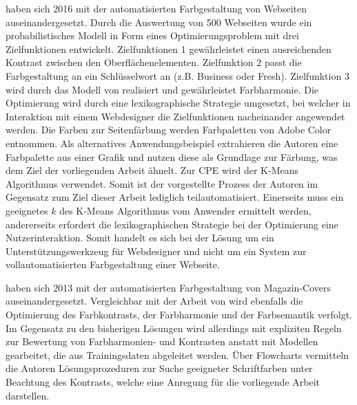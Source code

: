 \citet{webpage} haben sich 2016 mit der automatisierten Farbgestaltung von Webseiten auseinandergesetzt. Durch die Auswertung von 500 Webseiten wurde ein probabilistisches Modell in Form eines Optimierungsproblem mit drei Zielfunktionen entwickelt. Zielfunktionen 1 gewährleistet einen ausreichenden Kontrast zwischen den Oberflächenelementen. Zielfunktion 2 passt die Farbgestaltung an ein Schlüsselwort an (z.B. \glqq{}Business\grqq{} oder \glqq{}Fresh\grqq{}). Zielfunktion 3 wird durch das Modell von \citet{colorcomp} realisiert und gewährleistet Farbharmonie. Die Optimierung wird durch eine lexikographische Strategie umgesetzt, bei welcher in Interaktion mit einem Webdesigner die Zielfunktionen nacheinander angewendet werden. Die Farben zur Seitenfärbung werden Farbpaletten von Adobe Color entnommen. Als alternatives Anwendungsbeispiel extrahieren die Autoren eine Farbpalette aus einer Grafik und nutzen diese als Grundlage zur Färbung, was dem Ziel der vorliegenden Arbeit ähnelt. Zur CPE wird der K-Means Algorithmus verwendet. Somit ist der vorgestellte Prozess der Autoren im Gegensatz zum Ziel dieser Arbeit lediglich teilautomatisiert. Einerseits muss ein geeignetes $k$ des K-Means Algorithmus vom Anwender ermittelt werden, andererseits erfordert die lexikographischen Strategie bei der Optimierung eine Nutzerinteraktion. Somit handelt es sich bei der Lösung um ein Unterstützungswerkzeug für Webdesigner und nicht um ein System zur vollautomatisierten Farbgestaltung einer Webseite.

\citet{magazines}  haben sich 2013 mit der automatisierten Farbgestaltung von Magazin-Covers auseinandergesetzt. Vergleichbar mit der Arbeit von \citet{webpage} wird ebenfalls die Optimierung des Farbkontrasts, der Farbharmonie und der Farbsemantik verfolgt. Im Gegensatz zu den bisherigen Lösungen wird allerdings mit expliziten Regeln zur Bewertung von Farbharmonien- \citep{itten} und Kontrasten anstatt mit Modellen gearbeitet, die aus Trainingsdaten abgeleitet werden. Über Flowcharts vermitteln die Autoren Lösungsprozeduren zur Suche geeigneter Schriftfarben unter Beachtung des Kontrasts, welche eine Anregung für die vorliegende Arbeit darstellen.